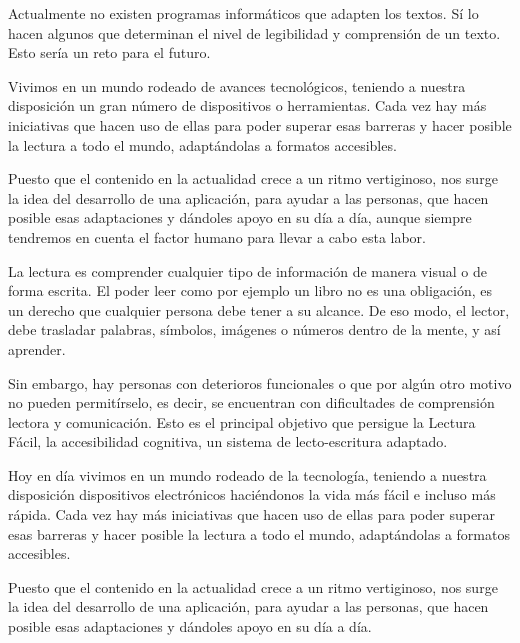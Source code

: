\setlength{\parskip}{10pt}

Actualmente no existen programas informáticos que adapten los textos. Sí lo hacen algunos que determinan el nivel de legibilidad y comprensión de un texto. Esto sería un reto para el futuro.  

\setlength{\parskip}{10pt}
Vivimos en un mundo rodeado de avances tecnológicos, teniendo a nuestra disposición un gran número de dispositivos o herramientas. Cada vez hay más iniciativas que hacen uso de ellas para poder superar esas barreras y hacer posible la lectura a todo el mundo, adaptándolas a formatos accesibles. 

 \setlength{\parskip}{10pt}
 
Puesto que el contenido en la actualidad crece a un ritmo vertiginoso, nos surge la idea del desarrollo de una aplicación, para ayudar a las personas, que hacen posible esas adaptaciones y dándoles apoyo en su día a día, aunque siempre tendremos en cuenta el factor humano para llevar a cabo esta labor.

La lectura es comprender cualquier tipo de información de manera visual o de forma escrita. El poder leer como por ejemplo un libro no es una obligación, es un derecho que cualquier persona debe tener a su alcance. De eso modo, el lector, debe trasladar palabras, símbolos, imágenes o números dentro de la mente, y así aprender.

 \setlength{\parskip}{10pt}

 Sin embargo, hay personas con deterioros funcionales o que por algún otro motivo no pueden permitírselo, es decir, se encuentran con dificultades de comprensión lectora y comunicación. Esto es el principal objetivo que persigue la Lectura Fácil, la accesibilidad cognitiva, un sistema de lecto-escritura adaptado.
 
 \setlength{\parskip}{10pt}
 
Hoy en día vivimos en un mundo rodeado de la tecnología, teniendo a nuestra disposición dispositivos electrónicos haciéndonos la vida más fácil e incluso más rápida. Cada vez hay más iniciativas que hacen uso de ellas para poder superar esas barreras y hacer posible la lectura a todo el mundo, adaptándolas a formatos accesibles. 

 \setlength{\parskip}{10pt}
 
Puesto que el contenido en la actualidad crece a un ritmo vertiginoso, nos surge la idea del desarrollo de una aplicación, para ayudar a las personas, que hacen posible esas adaptaciones y dándoles apoyo en su día a día.



